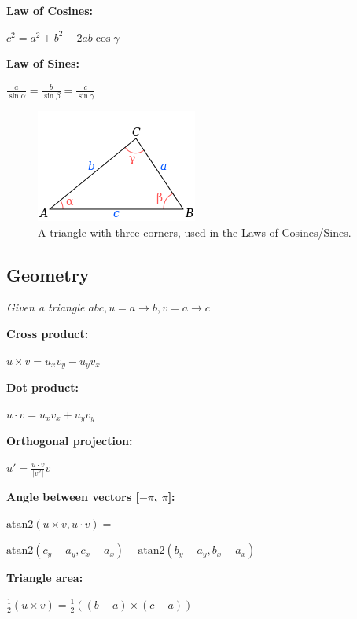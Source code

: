 \documentclass[8pt,a4paper,landscape,oneside]{amsart}
\begin{document}
\begin{multicols*}{3}
  \textbf{Law of Cosines:}
  
  $c^2 = a^2 + b^2 - 2ab\cos\gamma$
  \newline
  
  \textbf{Law of Sines:}
  
  $\frac{a}{\sin \alpha} = \frac{b}{\sin \beta} = \frac{c}{\sin \gamma}$ 
  \newline
  
  \begin{figure}[H]
  \centering
   \includegraphics[scale=0.5]{triangle_cosines.png}
   \caption{A triangle with three corners, used in the Laws of Cosines/Sines.}
   \label{triangle-cosines}
  \end{figure}

  \subsection{Geometry}
  \textit{Given a triangle $\mathit{abc, u = a \rightarrow b, v = a \rightarrow c}$}

  \textbf{Cross product:} 

  $u \times v = u_xv_y - u_yv_x$
  \newline

  \textbf{Dot product:} 

  $u \cdot v = u_xv_x + u_yv_y$
  \newline

  \textbf{Orthogonal projection:} 

  $u' = \frac{u \cdot v}{|v^2|}v$
  \newline

  \textbf{Angle between vectors [$-\pi$, $\pi$]:} 

  $\mathrm{atan2} (u \times v, u \cdot v) = $

  $\mathrm{atan2} (c_y - a_y, c_x - a_x) - \mathrm{atan2} (b_y - a_y, b_x - a_x)$
  \newline

  \textbf{Triangle area:} 

  $\frac{1}{2}(u \times v) = \frac{1}{2}((b-a) \times (c-a))$
  \newline


\end{multicols*}
\end{document}
